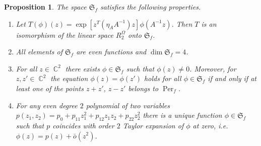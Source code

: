 \documentclass{amsart}
\numberwithin{equation}{section}
\newtheorem{proposition}[theorem]{Proposition}
\theoremstyle{definition}
\theoremstyle{remark}
\DeclareMathOperator{\CC}{\mathbb C}
\DeclareMathOperator{\Per}{Per}
\begin{document}
	\begin{proposition}\label{propSpaceS}
		The space $\mathfrak S_f$ satisfies the following properties.
		\begin{enumerate}[label=(\roman*)]
			\item\label{pSi} Let $T(\phi)(z) = \exp\left[z^T (\eta_AA^{-1})z\right]\phi(A^{-1}z)$. Then $T$ is an isomorphism of the linear space $R_2^\Omega$ onto $\mathfrak S_f$.
			\item\label{pSii} All elements of $\mathfrak S_f$ are even functions and $\dim \mathfrak S_f = 4$.
			\item\label{pSiii} For all $z \in \CC^2$ there exists $\phi \in \mathfrak S_f$ such that $\phi(z) \ne 0$. Moreover, for $z,z' \in \CC^2$ the equation $\phi(z) = \phi(z')$ holds for all $\phi \in \mathfrak S_f$ if and only if at least one of the points $z + z'$, $z - z'$ belongs to $\Per_f$.
			\item\label{pSiv} For any even degree $2$ polynomial of two variables $p(z_1,z_2) = p_0 + p_{11}z_1^2 + p_{12}z_1z_2 + p_{22}z_2^2$ there is a unique function $\phi \in \mathfrak S_f$ such that $p$ coincides with order $2$ Taylor expansion of $\phi$ at zero, i.e. $\phi(z) = p(z) + \bar{o}(z^2)$.
		\end{enumerate}
	\end{proposition}
\end{document}
